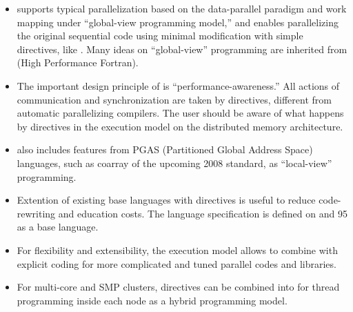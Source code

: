 \begin{itemize}

 \item {\XMP} supports typical parallelization based on the
       data-parallel paradigm and work mapping under ``global-view
       programming model,'' and enables parallelizing the original
       sequential code using minimal modification with simple
       directives, like {\OMP}. Many ideas on ``global-view''
       programming are inherited from {\HPF} (High Performance Fortran).

 \item The important design principle of {\XMP} is
       ``performance-awareness.'' All actions of communication and
       synchronization are taken by directives, different from automatic
       parallelizing compilers. The user should be aware of what happens
       by {\XMP} directives in the execution model on the distributed
       memory architecture.

 \item {\XMP} also includes features from PGAS (Partitioned Global
       Address Space) languages, such as coarray of the upcoming {\Fort}
       2008 standard, as ``local-view'' programming.

 \item Extention of existing base languages with directives is useful to
       reduce code-rewriting and education costs. The {\XMP} language
       specification is defined on {\C} and {\Fort} 95 as a base
       language.

 \item For flexibility and extensibility, the execution model allows to
       combine with explicit {\MPI} coding for more complicated and
       tuned parallel codes and libraries.

 \item For multi-core and SMP clusters, {\OMP} directives can be
       combined into {\XMP} for thread programming inside each node as a
       hybrid programming model.


\end{itemize}
